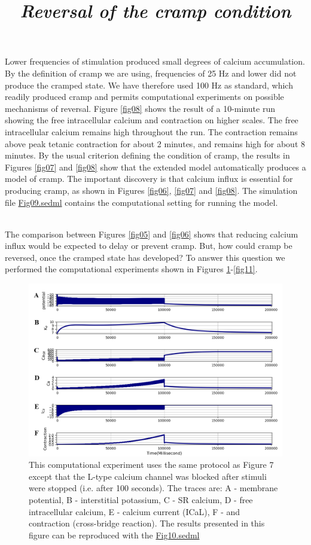 \documentclass[fleqn,10pt]{physiome}
\begin{document}
Lower frequencies of stimulation produced small degrees of calcium accumulation. By the definition of cramp we are using, frequencies of 25 Hz and lower did not produce the cramped state. We have therefore used 100 Hz as standard, which readily produced cramp and permits computational experiments on possible mechanisms of reversal. Figure \ref{fig08} shows the result of a 10-minute run showing the free intracellular calcium and contraction on higher scales. The free intracellular calcium remains high throughout the run. The contraction remains above peak tetanic contraction for about 2 minutes, and remains high for about 8 minutes. By the usual criterion defining the condition of cramp, the results in Figures \ref{fig07} and \ref{fig08} show that the extended model automatically produces a model of cramp. The important discovery is that calcium influx is essential for producing cramp, as shown in Figures \ref{fig06}, \ref{fig07} and \ref{fig08}. The simulation file \href{http://models.cellml.org/workspace/5f4/file/4071d5b4ec40c5e2b845a7a75e942df1966d2ba2/Fig09.sedml}{Fig09.sedml} contains the computational setting for running the model.

\title{\textit{Reversal of the cramp condition}}\\\newline
The comparison between Figures \ref{fig05} and \ref{fig06} shows that reducing calcium influx would be expected to delay or prevent cramp. But, how could cramp be reversed, once the cramped state has developed? To answer this question we performed the computational experiments shown in Figures \ref{fig09}-\ref{fig11}.\\\newline

\begin{figure}[h!]
\centering
\includegraphics[width=0.9\linewidth]{figure09}
\caption{This computational experiment uses the same protocol as Figure 7 except that the L-type calcium channel was blocked after stimuli were stopped (i.e. after 100 seconds). The traces are: A - membrane potential, B - interstitial potassium, C - SR calcium, D - free intracellular calcium, E - calcium current (ICaL), F - and contraction (cross-bridge reaction). The results presented in this figure can be reproduced with the \href{https://models.physiomeproject.org/workspace/5f4/file/26289d9227fbf4f66ca8106d8bf80ff9a51a5ac6/Fig10.sedml}{Fig10.sedml}}
\label{fig09}
\end{figure}
\end{document}
